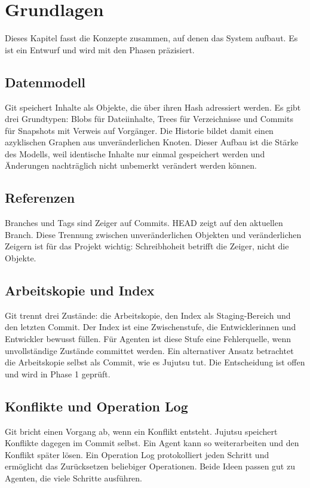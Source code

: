 \chapter{Grundlagen}

Dieses Kapitel fasst die Konzepte zusammen, auf denen das System aufbaut. Es ist ein Entwurf und wird mit den Phasen präzisiert.

\section{Datenmodell}

Git speichert Inhalte als Objekte, die über ihren Hash adressiert werden. Es gibt drei Grundtypen: Blobs für Dateiinhalte, Trees für Verzeichnisse und Commits für Snapshots mit Verweis auf Vorgänger. Die Historie bildet damit einen azyklischen Graphen aus unveränderlichen Knoten. Dieser Aufbau ist die Stärke des Modells, weil identische Inhalte nur einmal gespeichert werden und Änderungen nachträglich nicht unbemerkt verändert werden können.

\section{Referenzen}

Branches und Tags sind Zeiger auf Commits. HEAD zeigt auf den aktuellen Branch. Diese Trennung zwischen unveränderlichen Objekten und veränderlichen Zeigern ist für das Projekt wichtig: Schreibhoheit betrifft die Zeiger, nicht die Objekte.

\section{Arbeitskopie und Index}

Git trennt drei Zustände: die Arbeitskopie, den Index als Staging-Bereich und den letzten Commit. Der Index ist eine Zwischenstufe, die Entwicklerinnen und Entwickler bewusst füllen. Für Agenten ist diese Stufe eine Fehlerquelle, wenn unvollständige Zustände committet werden. Ein alternativer Ansatz betrachtet die Arbeitskopie selbst als Commit, wie es Jujutsu tut. Die Entscheidung ist offen und wird in Phase 1 geprüft.

\section{Konflikte und Operation Log}

Git bricht einen Vorgang ab, wenn ein Konflikt entsteht. Jujutsu speichert Konflikte dagegen im Commit selbst. Ein Agent kann so weiterarbeiten und den Konflikt später lösen. Ein Operation Log protokolliert jeden Schritt und ermöglicht das Zurücksetzen beliebiger Operationen. Beide Ideen passen gut zu Agenten, die viele Schritte ausführen.

